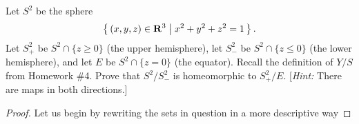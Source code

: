\newpage
\begin{problem}[B]
Let $S^2$ be the sphere
\[
\left\{\,(x,y,z)\in\mathbf{R}^3\;\middle|\;x^2+y^2+z^2=1\,\right\}.
\]
Let $S_+^2$ be $S^2\cap\{z\geq 0\}$ (the upper hemisphere), let
$S_-^2$ be $S^2\cap\{z\leq 0\}$ (the lower hemisphere), and let
$E$ be $S^2\cap\{z=0\}$ (the equator). Recall the definition of
$Y/S$ from Homework \#4. Prove that $S^2/S^2_-$ is homeomorphic
to $S_+^2/E$. [\emph{Hint:} There are maps in both directions.]
\end{problem}
\begin{proof}
Let us begin by rewriting the sets in question in a more
descriptive way
\end{proof}

